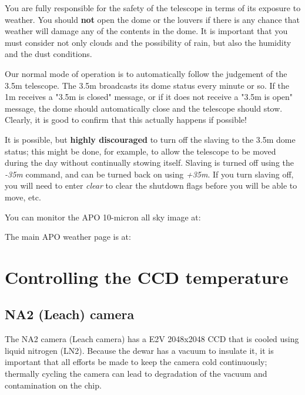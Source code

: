 \documentclass[10pt]{report}
\begin{document}
You are fully responsible for the safety of the telescope in terms of
its exposure to weather. You should \textbf{not} open the dome or the
louvers if there is any chance that weather will damage any of the contents
in the dome.  It is important that you must consider not only clouds 
and the possibility of rain, but also the humidity and the dust conditions.

Our normal mode of operation is to automatically follow the judgement of
the 3.5m telescope. The 3.5m broadcasts its dome status every minute or
so. If the 1m receives a "3.5m is closed" message, or if it does not receive
a "3.5m is open" message, the dome should automatically close and the
telescope should stow. Clearly, it is good to confirm that this actually
happens if possible!

It is possible, but \textbf{highly discouraged} to turn off the slaving
to the 3.5m dome status; this might be done, for example, to allow 
the telescope to be moved during the day without continually stowing
itself. Slaving is turned off using the \textit{-35m} command, and can
be turned back on using \textit{+35m}. If you turn slaving off, you 
will need to enter \textit{clear} to clear the shutdown flags before
you will be able to move, etc.

You can monitor the APO 10-micron all sky image at:
\begin{center}
\end{center}
The main APO weather page is at:
\begin{center}
\end{center}

\section{Controlling the CCD temperature}

\subsection{NA2 (Leach) camera}

The NA2 camera (Leach camera) has a E2V 2048x2048 CCD that is cooled using liquid
nitrogen (LN2). Because the dewar has a vacuum to insulate it, it is
important that all efforts be made to keep the camera cold continuously;
thermally cycling the camera can lead to degradation of the vacuum and
contamination on the chip.
\end{document}
